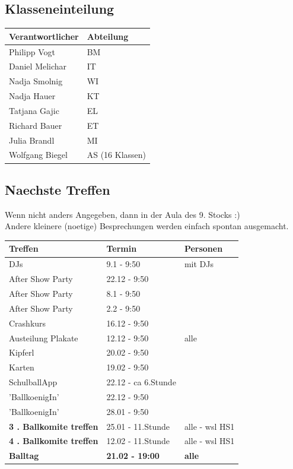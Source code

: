 \documentclass[12pt]{article}
\begin{document}
\subsection{Klasseneinteilung}
  \begin{tabular}{ | p{} | p{}  |}
    \hline
\textbf{Verantwortlicher} & \textbf{Abteilung}  \\ 
    \hline 
    \hline
 
Philipp Vogt & BM  \\ \hline
Daniel Melichar & IT  \\ \hline
Nadja Smolnig & WI \\ \hline
Nadja Hauer & KT   \\ \hline
Tatjana Gajic & EL  \\ \hline
Richard Bauer & ET \\ \hline
Julia Brandl & MI \\ \hline
Wolfgang Biegel  & AS (16 Klassen)\\ \hline
  \end{tabular}
  \subsection{Naechste Treffen}
  Wenn nicht anders Angegeben, dann in der Aula des 9. Stocks :) \\
  Andere kleinere (noetige) Besprechungen werden einfach spontan ausgemacht. \\
 \begin{tabular}{ | p{} | p{} |  p{} |}
    \hline
\textbf{Treffen} & \textbf{Termin} & \textbf{Personen}  \\ 
    \hline 
    \hline

DJs & 9.1 - 9:50 & mit DJs \\ \hline
After Show Party & 22.12 - 9:50 &  \\ \hline
After Show Party & 8.1 - 9:50 &  \\ \hline
After Show Party & 2.2 - 9:50 &  \\ \hline
Crashkurs & 16.12 - 9:50 &  \\ \hline
Austeilung Plakate & 12.12 - 9:50 & alle \\ \hline
Kipferl  & 20.02 - 9:50 &  \\ \hline
Karten  & 19.02 - 9:50 &  \\ \hline
SchulballApp  & 22.12 - ca 6.Stunde &  \\ \hline
'BallkoenigIn'  & 22.12 - 9:50 &  \\ \hline
'BallkoenigIn'   & 28.01 - 9:50 &  \\ \hline
\textbf{3 . Ballkomite treffen}   & 25.01 - 11.Stunde & alle - wsl HS1 \\ \hline
\textbf{4 . Ballkomite treffen}   & 12.02 - 11.Stunde & alle - wsl HS1 \\ \hline
\textbf{Balltag}  & \textbf{21.02 - 19:00} & \textbf{alle} \\ \hline


  \end{tabular}
  \newpage
\end{document}
